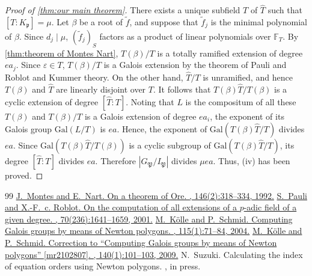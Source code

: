 \documentclass[10pt,a4paper]{amsart}
\newcommand{\field}[1]{\mathbb{#1}}
\newcommand{\Gal}{\mathrm{Gal}}
\numberwithin{equation}{section}
\begin{document}
\begin{proof}[Proof of \cref{thm:our main theorem}]
  There exists a unique subfield $T$ of $\hat{T}$ such that $[T:K_{\mathfrak{p}}] = \mu$. 
  Let $\beta$ be a root of $\tilde{f}$, and suppose that $\tilde{f}_j$ is the minimal polynomial of $\beta$. 
  Since $d_j \mid \mu$, $(\tilde{f}_j)_S$ factors as a product of linear polynomials over $\field{F}_T$. 
  By \cref{thm:theorem of Montes Nart}, $T(\beta)/T$ is a totally ramified extension of degree $ea_j$. 
  Since $\varepsilon \in T$, $T(\beta)/T$ is a Galois extension by the theorem of Pauli and Roblot and Kummer theory. 
  On the other hand, $\hat{T}/T$ is unramified, and hence $T(\beta)$ and $\hat{T}$ are linearly disjoint over $T$. 
  It follows that $T(\beta)\hat{T}/T(\beta)$ is a cyclic extension of degree $[\hat{T}:T]$. 
  Noting that $L$ is the compositum of all these $T(\beta)$ and $T(\beta)/T$ is a Galois extension of degree $ea_i$, 
  the exponent of its Galois group $\Gal(L/T)$ is $ea$. 
  Hence, the exponent of $\Gal(T(\beta)\hat{T}/T)$ divides $ea$. 
  Since $\Gal(T(\beta)\hat{T}/T(\beta))$ is a cyclic subgroup of $\Gal(T(\beta)\hat{T}/T)$, 
  its degree $[\hat{T}:T]$ divides $ea$. Therefore $|G_{\mathfrak{P}}/I_{\mathfrak{P}}|$ divides $\mu ea$. 
  Thus, (iv) has been proved. 

  \end{proof}


\begin{thebibliography}{99}
 \href{https://doi.org/10.1016/0021-8693(92)90071-S} {J.~Montes and E.~Nart. \newblock On a theorem of {O}re. , 146(2):318--334, 1992.}
 \href{https://doi.org/10.1090/S0025-5718-01-01306-0} {S.~Pauli and X.-F.~c. Roblot. \newblock On the computation of all extensions of a {$p$}-adic field of a given degree. , 70(236):1641--1659, 2001.}
 \href{https://doi.org/10.4064/aa115-1-6} {M.~K\"olle and P.~Schmid. \newblock Computing {G}alois groups by means of {N}ewton polygons. , 115(1):71--84, 2004.}
 \href{https://doi.org/10.4064/aa140-1-7} {M.~K\"olle and P.~Schmid. \newblock Correction to ``{C}omputing {G}alois groups by means of {N}ewton polygons'' [mr2102807]. , 140(1):101--103, 2009.}
 N.~Suzuki. \newblock Calculating the index of equation orders using Newton polygons. , in press.
\end{thebibliography}
\end{document}
